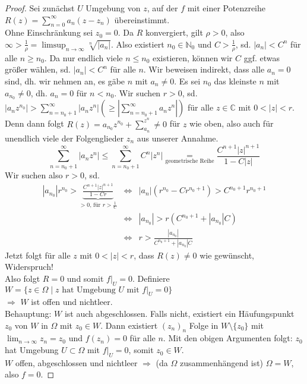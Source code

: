 \documentclass[11pt,titlepage]{article}
\theoremstyle{definition}
\theoremstyle{remark}
\begin{document}
	\begin{proof}
		Sei zunächst $U$ Umgebung von $z$, auf der $f$ mit einer Potenzreihe $R(z)=\sum_{n=0}^
		{\infty} a_n (z-z_n)$ übereinstimmt. \\
		Ohne Einschränkung sei $z_0 =0$. Da $R$ konvergiert, gilt $\rho >0$, also $\infty > \frac{1}{\rho}
		=\limsup_{n\to\infty} \sqrt[n]{|a_n|}$. Also existiert $n_0\in \mathbb{N}_0$ und $C>\frac{1}{\rho}$, 
		sd. $|a_n|< C^n$ für alle $n\geq n_0$. Da nur endlich viele $n\leq n_0$ existieren, können wir 
		$C$ ggf. etwas größer wählen, sd. $|a_n|<C^n$ für alle $n$. Wir beweisen indirekt, dass alle 
		$a_n =0$ sind, dh. wir nehmen an, es gäbe $n$ mit $a_n \neq 0$. Es sei $n_0$ das kleinste $n$ 
		mit $a_{n_{0}}\neq 0$, dh. $a_n =0$ für $n<n_0$. 
		Wir suchen $r>0$, sd. $|a_n z^{n_0} | > \sum_{n=n_0 +1}^{\infty} |a_n z^n | \left(\geq | \sum_{n=
		n_0 +1}^{\infty} a_n z^n |\right)$ für alle $z\in \mathbb{C}$ mit $0<|z|<r$. Denn dann folgt 
		$R(z)=a_{n_0} z^{n_0} +\sum_{a_n}^{z^n} \neq 0$ für $z$ wie oben, also auch für unendlich 
		viele der Folgenglieder $z_n$ aus unserer Annahme.
		\[ \sum_{n=n_0 +1}^{\infty} |a_n z^n| \leq \sum_{n=n_0 +1}^{\infty} C^n |z^n| \underset{\text{
		geometrische Reihe}}{=} \frac{C^{n+1}|z|^{n+1}}{1-C|z|} \]
		Wir suchen also $r>0$, sd.
		\begin{eqnarray*}
			|a_{n_0}|r^{n_0} > \underbrace{\frac{C^{n+1}|z|^{n+1}}{1-Cr}}_{\text{$>0$, für 
			$r>\frac{1}{C}$}} &\Leftrightarrow & |a_n| (r^{n_0} - Cr^{n_0 +1} ) > C^{n_0 +1} r^{n_0 +1} \\
			& \Leftrightarrow & |a_{n_0}| > r (C^{n_0 +1}+|a_{n_0}|C) \\
			& \Leftrightarrow & r>\frac{|a_{n_0}|}{C^{n_0 +1} + |a_{n_0}|C}
		\end{eqnarray*}
		Jetzt folgt für alle $z$ mit $0< |z|<r$, dass $R(z)\neq 0$ wie gewünscht, Widerspruch! \\
		Also folgt $R=0$ und somit $f|_U =0$.
		Definiere $W=\{ z\in\Omega \mid z\text{ hat Umgebung $U$ mit $f|_U =0$} \}$ \\
		$\Rightarrow$ $W$ ist offen und nichtleer. \\
		Behauptung: $W$ ist auch abgeschlossen. Falls nicht, existiert ein Häufungspunkt $z_0$ von 
		$W$ in $\Omega$ mit $z_0 \in W$. Dann existiert $(z_n)_n$ Folge in $W\setminus \{z_0\}$ mit 
		$\lim_{n\to\infty} z_n =z_0$ und $f(z_n)=0$ für alle $n$. Mit den obigen Argumenten folgt: 
		$z_0$ hat Umgebung $U\subset \Omega$ mit $f|_U =0$, somit $z_0 \in W$. \\
		$W$ offen, abgeschlossen und nichtleer $\Rightarrow$ (da $\Omega$ zusammenhängend ist) 
		$\Omega = W$, also $f=0$.
	\end{proof}
	
\end{document}
